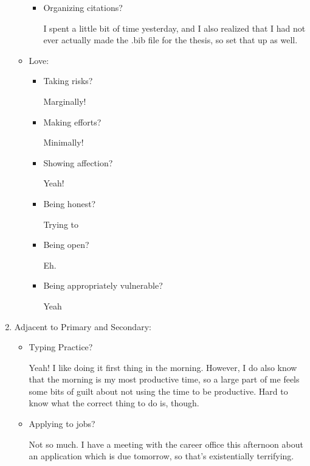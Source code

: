 \documentclass[12pt]{article}
\renewcommand{\,}{\textsuperscript{,}}
\begin{document}
\begin{enumerate}
\begin{itemize}
\begin{itemize}
\item Organizing citations?

I spent a little bit of time yesterday, and I also realized that I had not ever actually made the .bib file for the thesis, so set that up as well.

\end{itemize}

\item Love:

\begin{itemize}

\item Taking risks?

Marginally!

\item Making efforts?

Minimally!

\item Showing affection?

Yeah!

\item Being honest?

Trying to

\item Being open?

Eh.

\item Being appropriately vulnerable?

Yeah

\end{itemize}

\end{itemize}

\item Adjacent to Primary and Secondary:

\begin{itemize}

\item Typing Practice?

Yeah! I like doing it first thing in the morning. However, I do also know that the morning is my most productive time, so a large part of me feels some bits of guilt about not using the time to be productive. Hard to know what the correct thing to do is, though.

\item Applying to jobs?

Not so much. I have a meeting with the career office this afternoon about an application which is due tomorrow, so that's existentially terrifying.


\end{itemize}
\end{enumerate}
\end{document}
